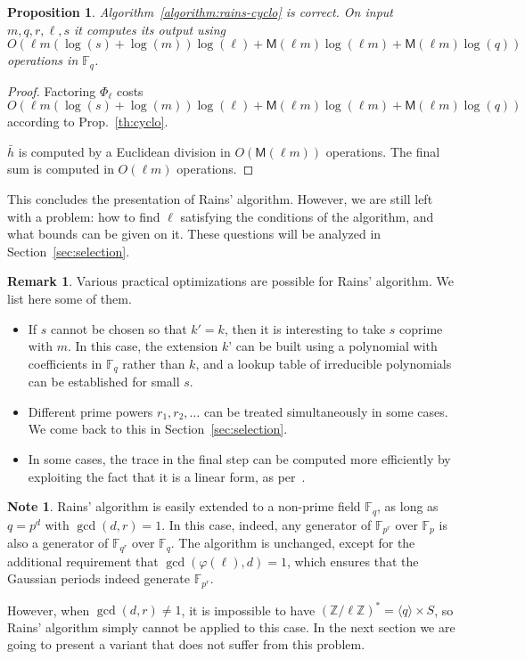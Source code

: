 \documentclass[12pt]{article}
\theoremstyle{plain}
\newtheorem{proposition}[theorem]{Proposition}
\theoremstyle{definition}
\newtheorem*{remark}{Remark}
\newtheorem{note}[theorem]{Note}
\def\Z{\ensuremath{\mathbb{Z}}}
\def\F{\ensuremath{\mathbb{F}}}
\def\MM{\ensuremath{\mathsf{M}}}
\def\euler{\ensuremath{\varphi}}
\newcounter{algorithm}
\begin{document}
\begin{proposition}
  Algorithm~\ref{algorithm:rains-cyclo} is correct. On input
  $m,q,r,\ell,s$ it computes its output using $O(\ell
  m(\log(s)+\log(m))\log(\ell) + \MM(\ell m)\log(\ell m) + \MM(\ell
  m)\log(q))$ operations in $\F_q$.
\end{proposition}
\begin{proof}
  Factoring $\Phi_\ell$ costs $O(\ell m(\log(s)+\log(m))\log(\ell) +
  \MM(\ell m)\log(\ell m) + \MM(\ell m)\log(q))$ according to
  Prop.~\ref{th:cyclo}.

  $\bar{h}$ is computed by a Euclidean division in $O(\MM(\ell m))$
  operations. The final sum is computed in $O(\ell m)$ operations.
\end{proof}


This concludes the presentation of Rains' algorithm. However, we are
still left with a problem: how to find $\ell$ satisfying the
conditions of the algorithm, and what bounds can be given on it. These
questions will be analyzed in Section~\ref{sec:selection}.

\begin{remark}
  Various practical optimizations are possible for Rains'
  algorithm. We list here some of them.
  \begin{itemize}
  \item If $s$ cannot be chosen so that $k'=k$, then it is interesting
    to take $s$ coprime with $m$. In this case, the extension $k$' can
    be built using a polynomial with coefficients in $\F_q$ rather
    than $k$, and a lookup table of irreducible polynomials can be
    established for small $s$.
  \item Different prime powers $r_1,r_2,\dots$ can be treated
    simultaneously in some cases. We come back to this in
    Section~\ref{sec:selection}.
  \item In some cases, the trace in the final step can be computed
    more efficiently by exploiting the fact that it is a linear form,
    as per~\cite{todo}.
  \end{itemize}
\end{remark}

\begin{note}
  \label{note:rains-non-prime}
  Rains' algorithm is easily extended to a non-prime field $\F_q$, as
  long as $q=p^d$ with $\gcd(d,r)=1$. In this case, indeed, any
  generator of $\F_{p^r}$ over $\F_p$ is also a generator of
  $\F_{q^r}$ over $\F_q$. The algorithm is unchanged, except for the
  additional requirement that $\gcd(\euler(\ell),d)=1$, which ensures
  that the Gaussian periods indeed generate $\F_{p^r}$.

  However, when $\gcd(d,r)\ne 1$, it is impossible to have
  $(\Z/\ell\Z)^\ast=\langle q\rangle\times S$, so Rains' algorithm
  simply cannot be applied to this case. In the next section we are
  going to present a variant that does not suffer from this problem.
\end{note}
\end{document}
